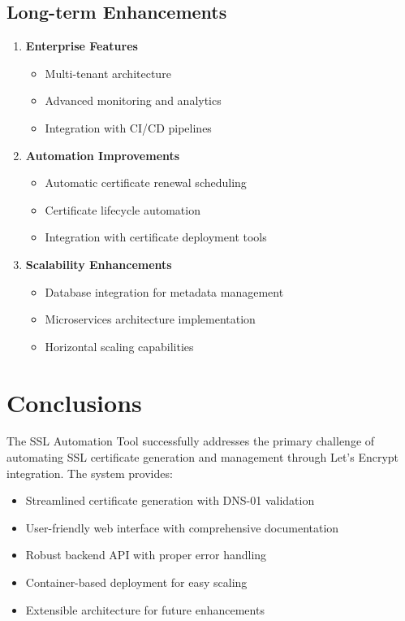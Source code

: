 \subsection{Long-term Enhancements}

\begin{enumerate}
    \item \textbf{Enterprise Features}
    \begin{itemize}
        \item Multi-tenant architecture
        \item Advanced monitoring and analytics
        \item Integration with CI/CD pipelines
    \end{itemize}
    
    \item \textbf{Automation Improvements}
    \begin{itemize}
        \item Automatic certificate renewal scheduling
        \item Certificate lifecycle automation
        \item Integration with certificate deployment tools
    \end{itemize}
    
    \item \textbf{Scalability Enhancements}
    \begin{itemize}
        \item Database integration for metadata management
        \item Microservices architecture implementation
        \item Horizontal scaling capabilities
    \end{itemize}
\end{enumerate}

\section{Conclusions}

The SSL Automation Tool successfully addresses the primary challenge of automating SSL certificate generation and management through Let's Encrypt integration. The system provides:

\begin{itemize}
    \item Streamlined certificate generation with DNS-01 validation
    \item User-friendly web interface with comprehensive documentation
    \item Robust backend API with proper error handling
    \item Container-based deployment for easy scaling
    \item Extensible architecture for future enhancements
\end{itemize}

